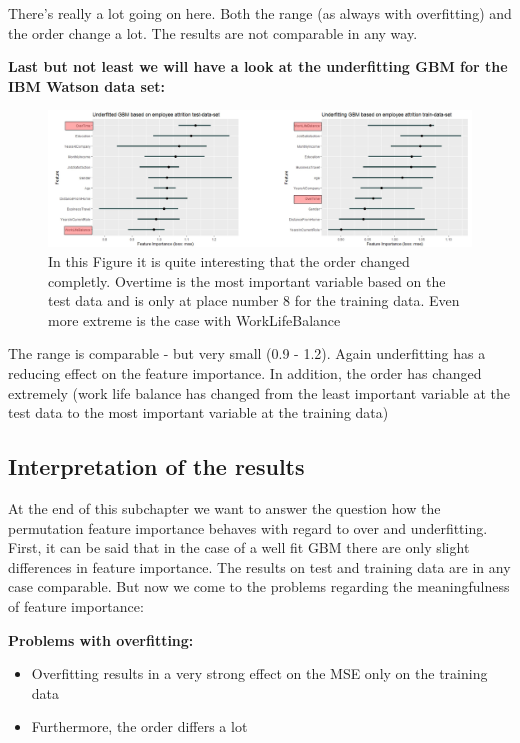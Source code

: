 \documentclass[
]{krantz}
\providecommand{\tightlist}{%
  \setlength{\itemsep}{0pt}\setlength{\parskip}{0pt}}
\begin{document}
There's really a lot going on here. Both the range (as always with overfitting) and the order change a lot. The results are not comparable in any way.

\textbf{Last but not least we will have a look at the underfitting GBM for the IBM Watson data set:}

\begin{figure}
\includegraphics[width=40.29in]{images/IBM_under} \caption{In this Figure it is quite interesting that the order changed completly. Overtime is the most important variable based on the test data and is only at place number 8 for the training data. Even more extreme is the case with WorkLifeBalance}\label{fig:unnamed-chunk-59}
\end{figure}

The range is comparable - but very small (0.9 - 1.2). Again underfitting has a reducing effect on the feature importance. In addition, the order has changed extremely (work life balance has changed from the least important variable at the test data to the most important variable at the training data)

\hypertarget{interpretation-of-the-results}{%
\subsection{Interpretation of the results}\label{interpretation-of-the-results}}

At the end of this subchapter we want to answer the question how the permutation feature importance behaves with regard to over and underfitting. First, it can be said that in the case of a well fit GBM there are only slight differences in feature importance. The results on test and training data are in any case comparable.
But now we come to the problems regarding the meaningfulness of feature importance:

\textbf{Problems with overfitting:}

\begin{itemize}
\tightlist
\item
  Overfitting results in a very strong effect on the MSE only on the training data
\item
  Furthermore, the order differs a lot
\end{itemize}
\end{document}
